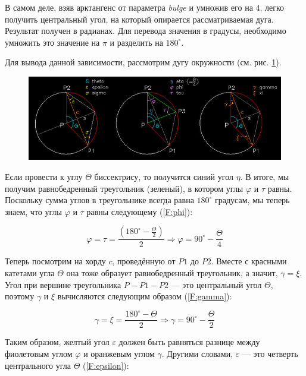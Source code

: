 В самом деле, взяв арктангенс от параметра \textit{bulge} и умножив его на $4$, легко получить центральный угол, на который опирается рассматриваемая дуга. Результат получен в радианах. Для перевода значения в градусы, необходимо умножить это значение на $\pi$ и разделить на $180^{\circ}$.

Для вывода данной зависимости, рассмотрим дугу окружности (см. рис. \ref{fig:arcchord}).

\begin{figure}[H]
	\centering
	\includegraphics[width=1.0\textwidth]{figures/arcchord.png}
	\label{fig:arcchord}
\end{figure}

Если провести к углу $\Theta$ биссектрису, то получится синий угол $\eta$. В итоге, мы получим равнобедренный треугольник (зеленый), в котором углы $\varphi$ и $\tau$ равны. Поскольку сумма углов в треугольнике всегда равна $180^{\circ}$ градусам, мы теперь знаем, что углы $\varphi$ и $\tau$ равны следующему (\ref{F:phi}):

\begin{equation}
	\varphi=\tau=\frac{(180^{\circ}-\frac{\Theta}{2})}{2}\Rightarrow\varphi=90^{\circ}-\frac{\Theta}{4}
	\label{F:phi}
\end{equation}

Теперь посмотрим на хорду $c$, проведённую от $P1$ до $P2$. Вместе с красными катетами угла $\Theta$ она тоже образует равнобедренный треугольник, а значит, $\gamma=\xi$. Угол при вершине треугольника $P-P1-P2$ --- это центральный угол $\Theta$, поэтому $\gamma$ и $\xi$ вычисляются следующим образом (\ref{F:gamma}):

\begin{equation}
	\gamma=\xi=\frac{180^{\circ}-\Theta}{2}\Rightarrow\gamma=90^{\circ}-\frac{\Theta}{2}
	\label{F:gamma}
\end{equation}

Таким образом, желтый угол $\varepsilon$ должен быть равняться разнице между фиолетовым углом $\varphi$ и оранжевым углом $\gamma$. Другими словами, $\varepsilon$ --- это четверть центрального угла $\Theta$ (\ref{F:epsilon}):

